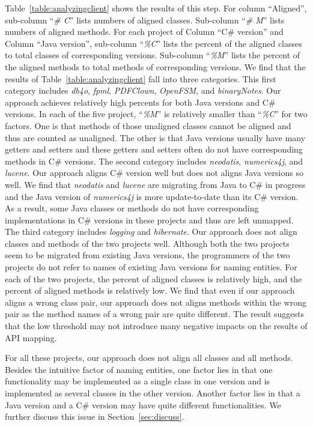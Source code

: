 Table~\ref{table:analyzingclient} shows the results of this step.
For column ``Aligned'', sub-column ``\emph{\# C}'' lists numbers of
aligned classes. Sub-column ``\emph{\# M}'' lists numbers of aligned
methods. For each project of Column ``C\# version'' and Column
``Java version'', sub-column ``\emph{\%C}'' lists the percent of the
aligned classes to total classes of corresponding versions.
Sub-column ``\emph{\%M}'' lists the percent of the aligned methods
to total methods of corresponding versions. We find that the results
of Table~\ref{table:analyzingclient} fall into three categories.
This first category includes \emph{db4o}, \emph{fpml},
\emph{PDFClown}, \emph{OpenFSM}, and \emph{binaryNotes}. Our
approach achieves relatively high percents for both Java versions
and C\# versions. In each of the five project, ``\emph{\%M}'' is
relatively smaller than ``\emph{\%C}'' for two factors. One is that
methods of those unaligned classes cannot be aligned and thus are
counted as unaligned. The other is that Java versions usually have
many getters and setters and these getters and setters often do not
have corresponding methods in C\# versions. The second category
includes \emph{neodatis}, \emph{numerics4j}, and \emph{lucene}. Our
approach aligns C\# version well but does not aligns Java versions
so well. We find that \emph{neodatis} and \emph{lucene} are
migrating from Java to C\# in progress and the Java version of
\emph{numerics4j} is more update-to-date than its C\# version. As a
result, some Java classes or methods do not have corresponding
implementations in C\# versions in these projects and thus are left
unmapped. The third category includes \emph{logging} and
\emph{hibernate}. Our approach does not align classes and methods of
the two projects well. Although both the two projects seem to be
migrated from existing Java versions, the programmers of the two
projects do not refer to names of existing Java versions for naming
entities. For each of the two projects, the percent of aligned
classes is relatively high, and the percent of aligned methods is
relatively low. We find that even if our approach aligns a wrong
class pair, our approach does not aligns methods within the wrong
pair as the method names of a wrong pair are quite different. The
result suggests that the low threshold may not introduce many
negative impacts on the results of API mapping.

For all these projects, our approach does not align all classes and
all methods. Besides the intuitive factor of naming entities, one
factor lies in that one functionality may be implemented as a single
class in one version and is implemented as several classes in the
other version. Another factor lies in that a Java version and a C\#
version may have quite different functionalities. We further discuss
this issue in Section~\ref{sec:discuss}.

